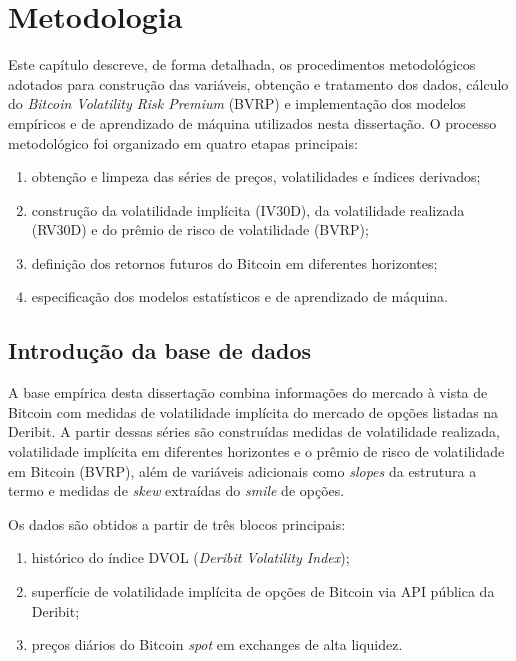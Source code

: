 
\chapter{Metodologia}
\label{chap:metodologia}

Este capítulo descreve, de forma detalhada, os procedimentos metodológicos
adotados para construção das variáveis, obtenção e tratamento dos dados,
cálculo do \textit{Bitcoin Volatility Risk Premium} (BVRP) e implementação dos
modelos empíricos e de aprendizado de máquina utilizados nesta dissertação.
O processo metodológico foi organizado em quatro etapas principais:

\begin{enumerate}
    \item obtenção e limpeza das séries de preços, volatilidades e índices derivados;
    \item construção da volatilidade implícita (IV30D), da volatilidade realizada (RV30D)
          e do prêmio de risco de volatilidade (BVRP);
    \item definição dos retornos futuros do Bitcoin em diferentes horizontes;
    \item especificação dos modelos estatísticos e de aprendizado de máquina.
\end{enumerate}

\section{Introdução da base de dados}
\label{sec:intro_base}

A base empírica desta dissertação combina informações do mercado à vista de
Bitcoin com medidas de volatilidade implícita do mercado de opções listadas na
Deribit. A partir dessas séries são construídas medidas de volatilidade realizada,
volatilidade implícita em diferentes horizontes e o prêmio de risco de volatilidade
em Bitcoin (BVRP), além de variáveis adicionais como \textit{slopes} da estrutura a termo
e medidas de \textit{skew} extraídas do \textit{smile} de opções.

Os dados são obtidos a partir de três blocos principais:

\begin{enumerate}
    \item histórico do índice DVOL (\textit{Deribit Volatility Index});
    \item superfície de volatilidade implícita de opções de Bitcoin via API pública da Deribit;
    \item preços diários do Bitcoin \textit{spot} em exchanges de alta liquidez.
\end{enumerate}


